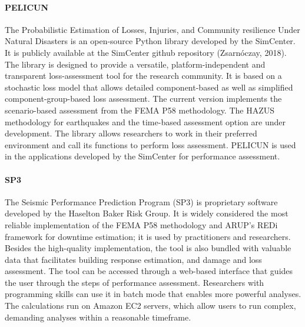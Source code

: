 \paragraph{PELICUN} The Probabilistic Estimation of Losses, Injuries, and Community resilience Under Natural Disasters is an open-source Python library developed by the SimCenter. It is publicly available at the SimCenter github repository (Zsarnóczay, 2018). The library is designed to provide a versatile, platform-independent and transparent loss-assessment tool for the research community. It is based on a stochastic loss model that allows detailed component-based as well as simplified component-group-based loss assessment. The current version implements the scenario-based assessment from the FEMA P58 methodology. The HAZUS methodology for earthquakes and the time-based assessment option are under development. The library allows researchers to work in their preferred environment and call its functions to perform loss assessment. PELICUN is used in the applications developed by the SimCenter for performance assessment.

\paragraph{SP3} The Seismic Performance Prediction Program (SP3) is proprietary software developed by the Haselton Baker Risk Group. It is widely considered the most reliable implementation of the FEMA P58 methodology and ARUP's REDi framework for downtime estimation; it is used by practitioners and researchers. Besides the high-quality implementation, the tool is also bundled with valuable data that facilitates building response estimation, and damage and loss assessment. The tool can be accessed through a web-based interface that guides the user through the steps of performance assessment. Researchers with programming skills can use it in batch mode that enables more powerful analyses. The calculations run on Amazon EC2 servers, which allow users to run complex, demanding analyses within a reasonable timeframe.
